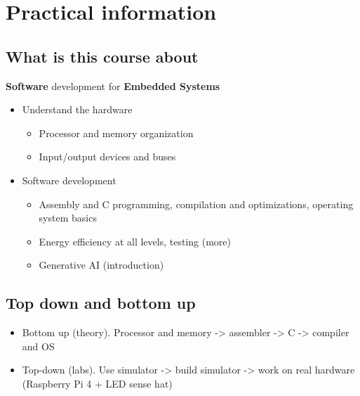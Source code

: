 \documentclass[a4paper,11pt,norsk]{article}
\begin{document}


\section{Practical information}
\subsection{What is this course about}
\textbf{\color{blue}Software} development for \textbf{\color{blue}Embedded Systems}
\begin{itemize}
    \item Understand the hardware
        \begin{itemize}
            \item Processor and memory organization
            \item Input/output devices and buses
        \end{itemize}
    \item Software development
        \begin{itemize}
            \item Assembly and C programming, compilation and optimizations, operating system basics
            \item Energy efficiency at all levels, testing (more)
            \item Generative AI (introduction)
        \end{itemize}
\end{itemize}

\subsection{Top down and bottom up}
\begin{itemize}
    \item Bottom up (theory). Processor and memory -> assembler -> C -> compiler and OS
    \item Top-down (labs). Use simulator -> build simulator -> work on real hardware (Raspberry Pi 4 + LED sense hat)
\end{itemize}
\end{document}
